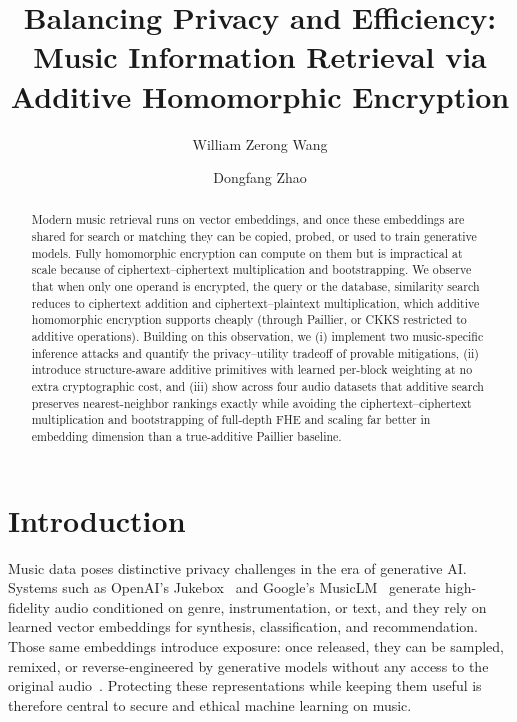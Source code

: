 \documentclass[sigconf,nonacm]{acmart}
\begin{document}
\title{Balancing Privacy and Efficiency: Music Information Retrieval via Additive Homomorphic Encryption}
\author{William Zerong Wang}
\author{Dongfang Zhao}
\renewcommand{\shortauthors}{Wang and Zhao}

\begin{abstract}
Modern music retrieval runs on vector embeddings, and once these embeddings are shared for search or matching they can be copied, probed, or used to train generative models. Fully homomorphic encryption can compute on them but is impractical at scale because of ciphertext--ciphertext multiplication and bootstrapping. We observe that when only one operand is encrypted, the query or the database, similarity search reduces to ciphertext addition and ciphertext--plaintext multiplication, which additive homomorphic encryption supports cheaply (through Paillier, or CKKS restricted to additive operations). Building on this observation, we (i) implement two music-specific inference attacks and quantify the privacy--utility tradeoff of provable mitigations, (ii) introduce structure-aware additive primitives with learned per-block weighting at no extra cryptographic cost, and (iii) show across four audio datasets that additive search preserves nearest-neighbor rankings exactly while avoiding the ciphertext--ciphertext multiplication and bootstrapping of full-depth FHE and scaling far better in embedding dimension than a true-additive Paillier baseline.
\end{abstract}
\maketitle

\section{Introduction}
Music data poses distinctive privacy challenges in the era of generative AI. Systems such as OpenAI's Jukebox~\cite{dhariwal2020jukebox} and Google's MusicLM~\cite{agostinelli2023musiclm} generate high-fidelity audio conditioned on genre, instrumentation, or text, and they rely on learned vector embeddings for synthesis, classification, and recommendation. Those same embeddings introduce exposure: once released, they can be sampled, remixed, or reverse-engineered by generative models without any access to the original audio~\cite{briot2017deep,esling2018bridging,ferguson2023generative}. Protecting these representations while keeping them useful is therefore central to secure and ethical machine learning on music.
\end{document}
